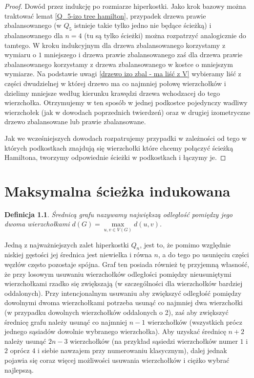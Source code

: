 \documentclass{pracamgr}
\newtheorem{defi}[theorem]{Definicja}
\begin{document}
    \begin{proof}
     Dowód przez indukcję po rozmiarze hiperkostki. Jako krok bazowy można traktować lemat \ref{Q_5-izo tree hamilton}, przypadek drzewa prawie zbalansowanego
     (w $Q_5$ istnieje takie tylko jedno nie będące ścieżką) i zbalansowanego dla $n=4$ (tu są tylko ścieżki) można rozpatrzyć analogicznie do tamtego.
     W kroku indukcyjnym dla drzewa zbalansowanego korzystamy z wymiaru o $1$ mniejszego i drzewa prawie zbalansowanego 
     zaś dla drzewa prawie zbalansowanego korzystamy z drzewa zbalansowanego w kostce o mniejszym wymiarze.
     Na podstawie uwagi \ref{drzewo izo zbal - ma liść z V} wybieramy liść z części dwudzielnej w której drzewo
     ma co najmniej połowę wierzchołków i dzielimy mniejsze według kierunku krawędzi drzewa wchodzacej do tego wierzchołka.
     Otrzymujemy w ten sposób w jednej podkostce pojedynczy wadliwy wierzchołek (jak w dowodach poprzednich twierdzeń)
     oraz w drugiej izometryczne drzewo zbalansowane lub prawie zbalansowane.
     
     Jak we wcześniejszych dowodach rozpatrujemy przypadki w zależności od tego w których podkostkach znajdują się wierzchołki
     które chcemy połączyć ścieżką Hamiltona, tworzymy odpowiednie ścieżki w podkostkach i łączymy je.
    \end{proof}

  \chapter{Maksymalna ścieżka indukowana}
   \begin{defi}\label{srednica grafu}
    \emph{Średnicą grafu} nazywamy największą odległość pomiędzy jego dwoma wierzchołkami $d(G)=\max\limits_{u,v\in V(G)}d(u,v)$.
   \end{defi}
   Jedną z najważniejszych zalet hiperkostki $Q_n$, jest to, że pomimo względnie niskiej gęstości jej średnica jest niewielka i równa $n$,
   a do tego po usunięciu części węzłów często pozostaje spójna.
   Graf ten posiada również tę przyjemną własność, że przy losowym usuwaniu wierzchołków odległości pomiędzy nieusuniętymi wierzchołkami rzadko się zwiększają
   (w szczególności dla wierzchołków bardziej oddalonych).
   Przy intencjonalnym usuwaniu aby zwiększyć odległość pomiędzy dowolnymi dwoma wierzchołkami potrzeba usunąć co najmniej dwa wierzchołki
   (w przypadku dowolnych wierzchołków oddalonych o 2), zaś aby zwiększyć średnicę grafu należy usunąć co najmniej $n-1$ wierzchołków
   (wszystkich prócz jednego sąsiadów dowolnie wybranego wierzchołka).
   Aby uzyskać średnicę $n+2$ należy usunąć $2n-3$ wierzchołków
   (na przykład sąsiedzi wierzchołków numer $1$ i $2$ oprócz $4$ i siebie nawzajem przy numerowaniu klasycznym),
   dalej jednak pojawia się coraz więcej możliwości usuwania wierzchołków i ciężko wybrać najlepszą.
    
\end{document}

